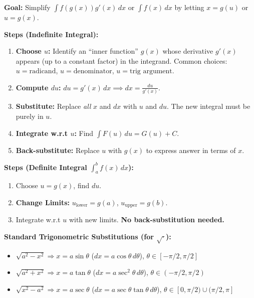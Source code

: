 \documentclass[11pt]{article}
\begin{document}
\begin{methode}
\textbf{Goal:} Simplify $\int f(g(x))g'(x)\,dx$ or $\int f(x)\,dx$ by letting $x = g(u)$ or $u = g(x)$.
\par\noindent\textbf{Steps (Indefinite Integral):}
\begin{enumerate}
    \item \textbf{Choose $u$:} Identify an ``inner function'' $g(x)$ whose derivative $g'(x)$ appears (up to a constant factor) in the integrand. Common choices: $u = \text{radicand}$, $u = \text{denominator}$, $u = \text{trig argument}$.
    \item \textbf{Compute $du$:} $du = g'(x)\,dx \implies dx = \frac{du}{g'(x)}$.
    \item \textbf{Substitute:} Replace \emph{all} $x$ and $dx$ with $u$ and $du$. The new integral must be purely in $u$.
    \item \textbf{Integrate w.r.t $u$:} Find $\int F(u)\,du = G(u) + C$.
    \item \textbf{Back-substitute:} Replace $u$ with $g(x)$ to express answer in terms of $x$.
\end{enumerate}
\textbf{Steps (Definite Integral $\int_a^b f(x)\,dx$):}
\begin{enumerate}
    \item Choose $u=g(x)$, find $du$.
    \item \textbf{Change Limits:} $u_{\text{lower}} = g(a)$, $u_{\text{upper}} = g(b)$.
    \item Integrate w.r.t $u$ with new limits. \textbf{No back-substitution needed.}
\end{enumerate}
\textbf{Standard Trigonometric Substitutions (for $\sqrt{\cdot}$):}
\begin{itemize}
    \item $\sqrt{a^2 - x^2} \Rightarrow x = a\sin\theta$ ($dx = a\cos\theta\,d\theta$), $\theta\in[-\pi/2,\pi/2]$
    \item $\sqrt{a^2 + x^2} \Rightarrow x = a\tan\theta$ ($dx = a\sec^2\theta\,d\theta$), $\theta\in(-\pi/2,\pi/2)$
    \item $\sqrt{x^2 - a^2} \Rightarrow x = a\sec\theta$ ($dx = a\sec\theta\tan\theta\,d\theta$), $\theta\in[0,\pi/2)\cup(\pi/2,\pi]$
\end{itemize}
\end{methode}
\end{document}
